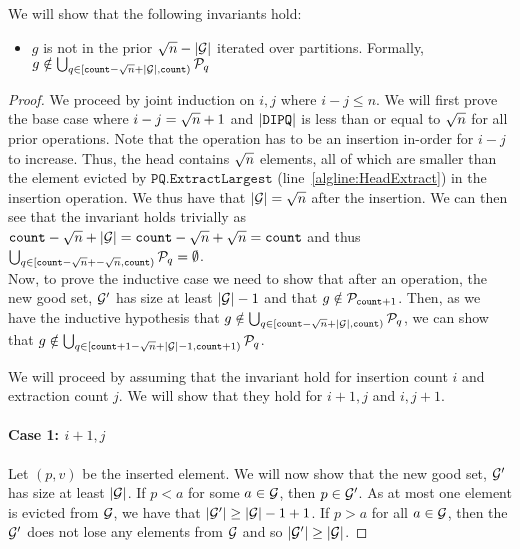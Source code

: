 We will show that the following invariants hold:
\begin{itemize}
	\item $g$ is not in the prior ${\sqrt{n}} - |\mathcal{G}|$ iterated over partitions. Formally, $g \notin \bigcup_{q \in [{\texttt{count}} - {\sqrt{n}} + |\mathcal{G}|, {\texttt{count}})} \mathcal{P}_q$
\end{itemize}

\begin{proof}
We proceed by joint induction on $i, j$ where $i - j \leq n$. 
We will first prove the base case where $i - j = {\sqrt{n}} + 1$ and $|\texttt{DIPQ}|$ is less than or equal to ${\sqrt{n}}$ for all prior operations.
Note that the operation has to be an insertion in-order for $i - j$ to increase. Thus, the head contains ${\sqrt{n}}$ elements, all of which are smaller than the element evicted by $\texttt{PQ.ExtractLargest}$ (line~\ref{algline:HeadExtract}) in the insertion operation.
We thus have that $|\mathcal{G}| = {\sqrt{n}}$ after the insertion. 
We can then see that the invariant holds trivially as ${\texttt{count}} - {\sqrt{n}} + |\mathcal{G}| = {\texttt{count}} - {\sqrt{n}} + {\sqrt{n}} = {\texttt{count}}$ and thus
$\bigcup_{q \in [{\texttt{count}} - {\sqrt{n}} + -{\sqrt{n}}, {\texttt{count}})} \mathcal{P}_q = \emptyset$.\\

Now, to prove the inductive case we need to show that after an operation, the new good set, $\mathcal{G}'$ has size
at least $|\mathcal{G}| - 1$ and that $g \notin \mathcal{P}_{{\texttt{count}} + 1}$. Then, as we have the inductive hypothesis
that $g \notin \bigcup_{q \in [{\texttt{count}} - {\sqrt{n}} + |\mathcal{G}|, {\texttt{count}})} \mathcal{P}_q$, 
we can show that $g \notin \bigcup_{q \in [{\texttt{count}} + 1 - {\sqrt{n}} + |\mathcal{G}| - 1, {\texttt{count}} + 1)} \mathcal{P}_q$.

We will proceed by assuming that the invariant hold for insertion count $i$ and extraction count $j$. We will show that they hold for $i + 1, j$ and $i, j + 1$.
\paragraph*{Case 1: $i + 1, j$}
\label{proof:case1}
Let $(p, v)$ be the inserted element. We will now show that the new good set, $\mathcal{G}'$
has size at least $|\mathcal{G}|$.
If $p < a$ for some $a \in \mathcal{G}$, then $p \in \mathcal{G}'$. As at most one element is evicted from $\mathcal{G}$,
we have that $|\mathcal{G}'| \geq |\mathcal{G}| - 1 + 1$. If $p > a$ for all $a \in \mathcal{G}$, then the $\mathcal{G}'$ does not lose any elements from $\mathcal{G}$ and so
$|\mathcal{G}'| \geq |\mathcal{G}|$.


\end{proof}
